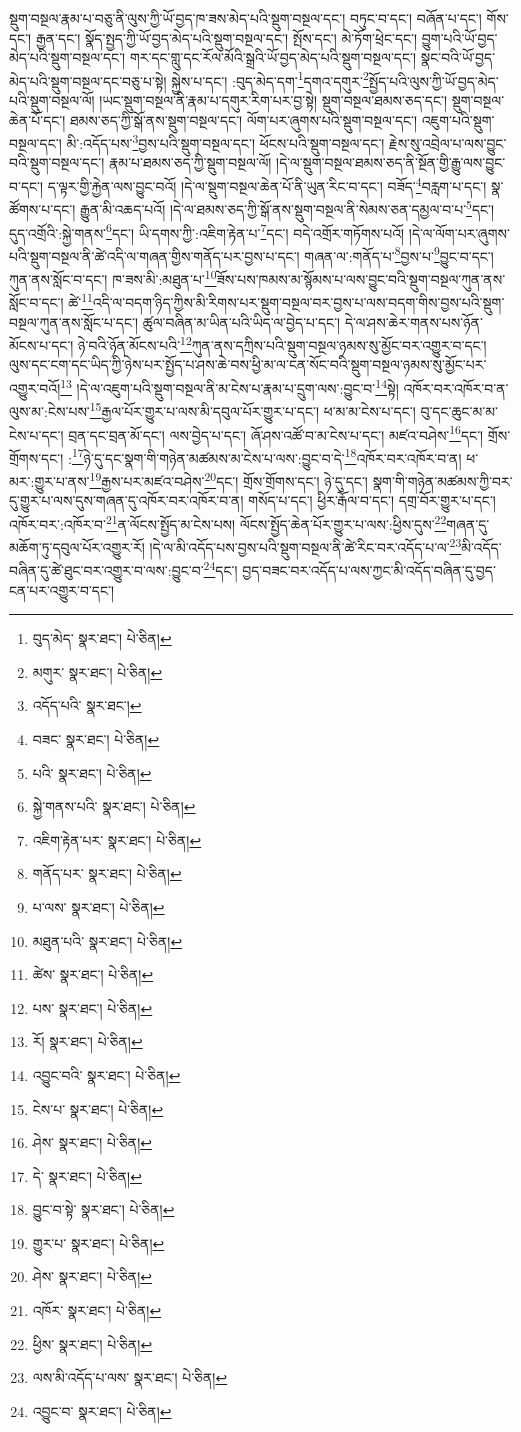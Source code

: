 སྡུག་བསྔལ་རྣམ་པ་བཅུ་ནི་ལུས་ཀྱི་ཡོ་བྱད་ཁ་ཟས་མེད་པའི་སྡུག་བསྔལ་དང་། བཏུང་བ་དང་། བཞོན་པ་དང་། གོས་དང་། རྒྱན་དང་། སྣོད་སྤྱད་ཀྱི་ཡོ་བྱད་མེད་པའི་སྡུག་བསྔལ་དང་། སྤོས་དང་། མེ་ཏོག་ཕྲེང་དང་། བྱུག་པའི་ཡོ་བྱད་མེད་པའི་སྡུག་བསྔལ་དང་། གར་དང་གླུ་དང་རོལ་མོའི་སྒྲའི་ཡོ་བྱད་མེད་པའི་སྡུག་བསྔལ་དང་། སྣང་བའི་ཡོ་བྱད་མེད་པའི་སྡུག་བསྔལ་དང་བཅུ་པ་སྟེ། སྐྱེས་པ་དང་། :བུད་མེད་དག་\footnote{བུད་མེད་  སྣར་ཐང་།  པེ་ཅིན། }དགའ་དགུར་\footnote{མགུར་  སྣར་ཐང་།  པེ་ཅིན། }སྤྱོད་པའི་ལུས་ཀྱི་ཡོ་བྱད་མེད་པའི་སྡུག་བསྔལ་ལོ། །ཡང་སྡུག་བསྔལ་ནི་རྣམ་པ་དགུར་རིག་པར་བྱ་སྟེ། སྡུག་བསྔལ་ཐམས་ཅད་དང་། སྡུག་བསྔལ་ཆེན་པོ་དང་། ཐམས་ཅད་ཀྱི་སྒོ་ནས་སྡུག་བསྔལ་དང་། ལོག་པར་ཞུགས་པའི་སྡུག་བསྔལ་དང་། འཇུག་པའི་སྡུག་བསྔལ་དང་། མི་:འདོད་པས་\footnote{འདོད་པའི་  སྣར་ཐང་། }བྱས་པའི་སྡུག་བསྔལ་དང་། ཕོངས་པའི་སྡུག་བསྔལ་དང་། རྗེས་སུ་འབྲེལ་པ་ལས་བྱུང་བའི་སྡུག་བསྔལ་དང་། རྣམ་པ་ཐམས་ཅད་ཀྱི་སྡུག་བསྔལ་ལོ། །དེ་ལ་སྡུག་བསྔལ་ཐམས་ཅད་ནི་སྔོན་གྱི་རྒྱུ་ལས་བྱུང་བ་དང་། ད་ལྟར་གྱི་རྐྱེན་ལས་བྱུང་བའོ། །དེ་ལ་སྡུག་བསྔལ་ཆེན་པོ་ནི་ཡུན་རིང་བ་དང་། བཟོད་\footnote{བཟང་  སྣར་ཐང་།  པེ་ཅིན། }བརླག་པ་དང་། སྣ་ཚོགས་པ་དང་། རྒྱུན་མི་འཆད་པའོ། །དེ་ལ་ཐམས་ཅད་ཀྱི་སྒོ་ནས་སྡུག་བསྔལ་ནི་སེམས་ཅན་དམྱལ་བ་པ་\footnote{པའི་  སྣར་ཐང་།  པེ་ཅིན། }དང་། དུད་འགྲོའི་:སྐྱེ་གནས་\footnote{སྐྱེ་གནས་པའི་  སྣར་ཐང་།  པེ་ཅིན། }དང་། ཡི་དགས་ཀྱི་:འཇིག་རྟེན་པ་\footnote{འཇིག་རྟེན་པར་  སྣར་ཐང་།  པེ་ཅིན། }དང་། བདེ་འགྲོར་གཏོགས་པའོ། །དེ་ལ་ལོག་པར་ཞུགས་པའི་སྡུག་བསྔལ་ནི་ཚེ་འདི་ལ་གཞན་གྱིས་གནོད་པར་བྱས་པ་དང་། གཞན་ལ་:གནོད་པ་\footnote{གནོད་པར་  སྣར་ཐང་།  པེ་ཅིན། }བྱས་པ་\footnote{པ་ལས་  སྣར་ཐང་།  པེ་ཅིན། }བྱུང་བ་དང་། ཀུན་ནས་སློང་བ་དང་། ཁ་ཟས་མི་:མཐུན་པ་\footnote{མཐུན་པའི་  སྣར་ཐང་།  པེ་ཅིན། }ཟོས་པས་ཁམས་མ་སྙོམས་པ་ལས་བྱུང་བའི་སྡུག་བསྔལ་ཀུན་ནས་སློང་བ་དང་། ཚེ་\footnote{ཚེས་  སྣར་ཐང་།  པེ་ཅིན། }འདི་ལ་བདག་ཉིད་ཀྱིས་མི་རིགས་པར་སྡུག་བསྔལ་བར་བྱས་པ་ལས་བདག་གིས་བྱས་པའི་སྡུག་བསྔལ་ཀུན་ནས་སློང་པ་དང་། ཚུལ་བཞིན་མ་ཡིན་པའི་ཡིད་ལ་བྱེད་པ་དང་། དེ་ལ་ཤས་ཆེར་གནས་པས་ཉོན་མོངས་པ་དང་། ཉེ་བའི་ཉོན་མོངས་པའི་\footnote{པས་  སྣར་ཐང་།  པེ་ཅིན། }ཀུན་ནས་དཀྲིས་པའི་སྡུག་བསྔལ་ཉམས་སུ་མྱོང་བར་འགྱུར་བ་དང་། ལུས་དང་ངག་དང་ཡིད་ཀྱི་ཉེས་པར་སྤྱོད་པ་ཤས་ཆེ་བས་ཕྱི་མ་ལ་ངན་སོང་བའི་སྡུག་བསྔལ་ཉམས་སུ་མྱོང་པར་འགྱུར་བའོ།\footnote{རོ།  སྣར་ཐང་།  པེ་ཅིན། } །དེ་ལ་འཇུག་པའི་སྡུག་བསྔལ་ནི་མ་ངེས་པ་རྣམ་པ་དྲུག་ལས་:བྱུང་བ་\footnote{འབྱུང་བའི་  སྣར་ཐང་།  པེ་ཅིན། }སྟེ། འཁོར་བར་འཁོར་བ་ན་ལུས་མ་:ངེས་པས་\footnote{ངེས་པ་  སྣར་ཐང་།  པེ་ཅིན། }རྒྱལ་པོར་གྱུར་པ་ལས་མི་དབུལ་པོར་གྱུར་པ་དང་། ཕ་མ་མ་ངེས་པ་དང་། བུ་དང་ཆུང་མ་མ་ངེས་པ་དང་། བྲན་དང་བྲན་མོ་དང་། ལས་བྱེད་པ་དང་། ཞོ་ཤས་འཚོ་བ་མ་ངེས་པ་དང་། མཛའ་བཤེས་\footnote{ཤེས་  སྣར་ཐང་།  པེ་ཅིན། }དང་། གྲོས་གྲོགས་དང་། :\footnote{དེ་  སྣར་ཐང་།  པེ་ཅིན། }ཉེ་དུ་དང་སྣག་གི་གཉེན་མཚམས་མ་ངེས་པ་ལས་:བྱུང་བ་དེ་\footnote{བྱུང་བ་སྟེ་  སྣར་ཐང་།  པེ་ཅིན། }འཁོར་བར་འཁོར་བ་ན། ཕ་མར་:གྱུར་པ་ནས་\footnote{གྱུར་པ་  སྣར་ཐང་།  པེ་ཅིན། }རྒྱས་པར་མཛའ་བཤེས་\footnote{ཤེས་  སྣར་ཐང་།  པེ་ཅིན། }དང་། གྲོས་གྲོགས་དང་། ཉེ་དུ་དང་། སྣག་གི་གཉེན་མཚམས་ཀྱི་བར་དུ་གྱུར་པ་ལས་དུས་གཞན་དུ་འཁོར་བར་འཁོར་བ་ན། གསོད་པ་དང་། ཕྱིར་རྒོལ་བ་དང་། དགྲ་བོར་གྱུར་པ་དང་། འཁོར་བར་:འཁོར་བ་\footnote{འཁོར་  སྣར་ཐང་།  པེ་ཅིན། }ན་ལོངས་སྤྱོད་མ་ངེས་པས། ལོངས་སྤྱོད་ཆེན་པོར་གྱུར་པ་ལས་:ཕྱིས་དུས་\footnote{ཕྱིས་  སྣར་ཐང་།  པེ་ཅིན། }གཞན་དུ་མཆོག་ཏུ་དབུལ་པོར་འགྱུར་རོ། །དེ་ལ་མི་འདོད་པས་བྱས་པའི་སྡུག་བསྔལ་ནི་ཚེ་རིང་བར་འདོད་པ་ལ་\footnote{ལས་མི་འདོད་པ་ལས་  སྣར་ཐང་།  པེ་ཅིན། }མི་འདོད་བཞིན་དུ་ཚེ་ཐུང་བར་འགྱུར་བ་ལས་:བྱུང་བ་\footnote{འབྱུང་བ་  སྣར་ཐང་།  པེ་ཅིན། }དང་། བྱད་བཟང་བར་འདོད་པ་ལས་ཀྱང་མི་འདོད་བཞིན་དུ་བྱད་ངན་པར་འགྱུར་བ་དང་། 